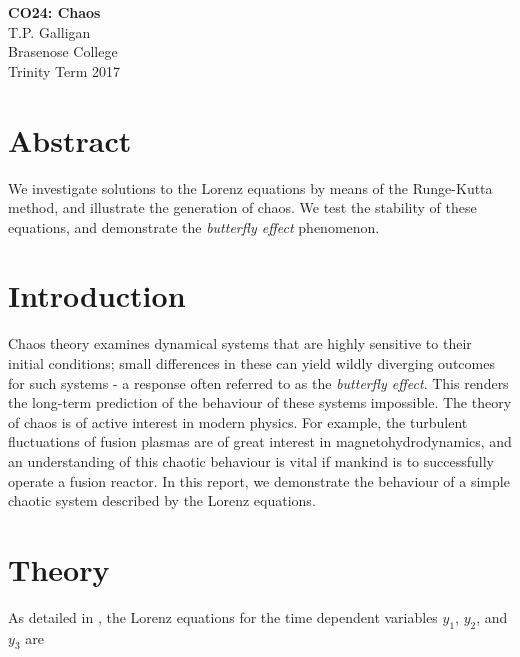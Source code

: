 \documentclass[a4paper,11pt]{article}
\begin{document}
\begin{center}
\Large{\textbf{CO24: Chaos}}\\ 
\vspace{1em}
\large{T.P. Galligan}\\
\large{Brasenose College}\\
\large{Trinity Term 2017}
\end{center}
\section{Abstract}
We investigate solutions to the Lorenz equations by means of the Runge-Kutta method, and illustrate the generation of chaos. We test the stability of these equations, and demonstrate the \textit{butterfly effect} phenomenon. 

\section{Introduction}
Chaos theory examines dynamical systems that are highly sensitive to their initial conditions; small differences in these can yield wildly diverging outcomes for such systems - a response often referred to as the \textit{butterfly effect}. This renders the long-term prediction of the behaviour of these systems impossible. The theory of chaos is of active interest in modern physics. For example, the turbulent fluctuations of fusion plasmas are of great interest in magnetohydrodynamics, and an understanding of this chaotic behaviour is vital if mankind is to successfully operate a fusion reactor\cite{plasma}.  In this report, we demonstrate the behaviour of a simple chaotic system described by the Lorenz equations. 
\section{Theory}
As detailed in \cite{script}, the Lorenz equations for the time dependent variables $y_1$, $y_2$, and $y_3$ are 
\end{document}
